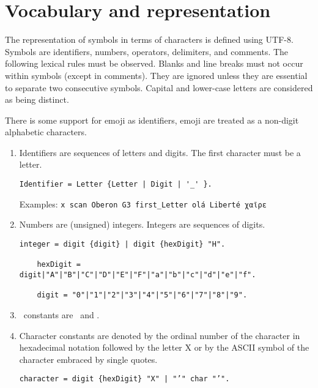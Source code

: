 \documentclass[12pt]{article}
\begin{document}
\section{Vocabulary and representation}

The representation of symbols in terms of characters is defined using UTF-8. Symbols are identifiers, numbers, operators, delimiters, and comments. The following lexical rules must be observed. Blanks and line breaks must not occur within symbols (except in comments). They are ignored unless they are essential to separate two consecutive symbols. Capital and lower-case letters are considered as being distinct. 

There is some support for emoji as identifiers, emoji are treated as a non-digit alphabetic characters.

\begin{enumerate}
    \item Identifiers are sequences of letters and digits. The first character must be a letter.
    
\begin{lstlisting}[style=ebnf]
Identifier = Letter {Letter | Digit | '_' }.
\end{lstlisting}

Examples: \lstinline!x scan Oberon G3 first_Letter olá Liberté χαῖρε! 

\item Numbers are (unsigned) integers. Integers are sequences of digits.

\begin{lstlisting}[style=ebnf]
    integer = digit {digit} | digit {hexDigit} "H".

    hexDigit = digit|"A"|"B"|"C"|"D"|"E"|"F"|"a"|"b"|"c"|"d"|"e"|"f".

    digit = "0"|"1"|"2"|"3"|"4"|"5"|"6"|"7"|"8"|"9".
\end{lstlisting}

\item \BOOLEAN\ constants are \TRUE\ and \FALSE. \label{bool-consts}

\item Character constants are denoted by the ordinal number of the character in hexadecimal notation followed by the letter X or by the ASCII symbol of the character embraced by single quotes.

\begin{lstlisting}[style=ebnf]
    character = digit {hexDigit} "X" | "’" char "’".
\end{lstlisting}


\end{enumerate}
\end{document}
